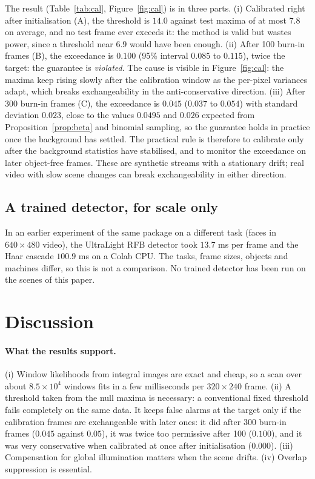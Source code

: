 \documentclass[11pt,a4paper]{article}
\theoremstyle{definition}
\begin{document}
The result (Table~\ref{tab:cal}, Figure~\ref{fig:cal}) is in three parts.
(i) Calibrated right after initialisation (A), the threshold is $14.0$ against test maxima of at most $7.8$ on average, and no test frame ever exceeds it: the method is valid but wastes power, since a threshold near $6.9$ would have been enough.
(ii) After 100 burn-in frames (B), the exceedance is $0.100$ (95\% interval $0.085$ to $0.115$), twice the target: the guarantee is \emph{violated}. The cause is visible in Figure~\ref{fig:cal}: the maxima keep rising slowly after the calibration window as the per-pixel variances adapt, which breaks exchangeability in the anti-conservative direction.
(iii) After 300 burn-in frames (C), the exceedance is $0.045$ ($0.037$ to $0.054$) with standard deviation $0.023$, close to the values $0.0495$ and $0.026$ expected from Proposition~\ref{prop:beta} and binomial sampling, so the guarantee holds in practice once the background has settled.
The practical rule is therefore to calibrate only after the background statistics have stabilised, and to monitor the exceedance on later object-free frames.
These are synthetic streams with a stationary drift; real video with slow scene changes can break exchangeability in either direction.

\subsection{A trained detector, for scale only}\label{sec:face}
In an earlier experiment of the same package on a different task (faces in $640\times480$ video), the UltraLight RFB detector took $13.7$ ms per frame and the Haar cascade $100.9$ ms on a Colab CPU.
The tasks, frame sizes, objects and machines differ, so this is not a comparison.
No trained detector has been run on the scenes of this paper.

\section{Discussion}\label{sec:discussion}
\paragraph{What the results support.}
(i) Window likelihoods from integral images are exact and cheap, so a scan over about $8.5\times10^4$ windows fits in a few milliseconds per $320\times240$ frame.
(ii) A threshold taken from the null maxima is necessary: a conventional fixed threshold fails completely on the same data. It keeps false alarms at the target only if the calibration frames are exchangeable with later ones: it did after 300 burn-in frames ($0.045$ against $0.05$), it was twice too permissive after 100 ($0.100$), and it was very conservative when calibrated at once after initialisation ($0.000$).
(iii) Compensation for global illumination matters when the scene drifts.
(iv) Overlap suppression is essential.
\end{document}
